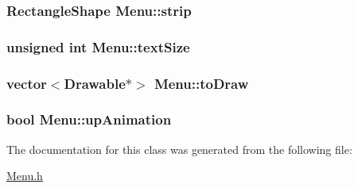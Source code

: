 \subsubsection[{\texorpdfstring{strip}{strip}}]{\setlength{\rightskip}{0pt plus 5cm}Rectangle\+Shape Menu\+::strip\hspace{0.3cm}{\ttfamily [private]}}\hypertarget{classMenu_a56e4febfec0254757193602cabcb88e1}{}\label{classMenu_a56e4febfec0254757193602cabcb88e1}
\subsubsection[{\texorpdfstring{text\+Size}{textSize}}]{\setlength{\rightskip}{0pt plus 5cm}unsigned int Menu\+::text\+Size\hspace{0.3cm}{\ttfamily [private]}}\hypertarget{classMenu_af50094c0a9831c625dc16a713652777c}{}\label{classMenu_af50094c0a9831c625dc16a713652777c}
\subsubsection[{\texorpdfstring{to\+Draw}{toDraw}}]{\setlength{\rightskip}{0pt plus 5cm}vector$<$Drawable$\ast$$>$ Menu\+::to\+Draw\hspace{0.3cm}{\ttfamily [private]}}\hypertarget{classMenu_ad64e0b08c47706709d3b23a61caf036f}{}\label{classMenu_ad64e0b08c47706709d3b23a61caf036f}
\subsubsection[{\texorpdfstring{up\+Animation}{upAnimation}}]{\setlength{\rightskip}{0pt plus 5cm}bool Menu\+::up\+Animation\hspace{0.3cm}{\ttfamily [private]}}\hypertarget{classMenu_add7681941b1c69a7ffd83838dfd0b308}{}\label{classMenu_add7681941b1c69a7ffd83838dfd0b308}


The documentation for this class was generated from the following file\+:\begin{DoxyCompactItemize}
\item 
\hyperlink{Menu_8h}{Menu.\+h}\end{DoxyCompactItemize}
